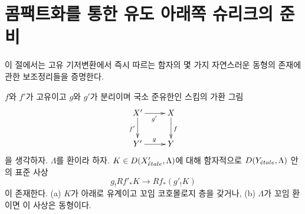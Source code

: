\section{콤팩트화를 통한 유도 아래쪽 슈리크의 준비}
\label{section-prelim}

\noindent
이 절에서는 고유 기저변환에서 즉시 따르는 함자의 몇 가지 자연스러운
동형의 존재에 관한 보조정리들을 증명한다.

\begin{lemma}
\label{lemma-shriek-proper-and-open}
$f$와 $f'$가 고유이고 $g$와 $g'$가 분리이며 국소 준유한인 스킴의
가환 그림
$$
\xymatrix{
X' \ar[r]_{g'} \ar[d]_{f'} & X \ar[d]^f \\
Y' \ar[r]^g & Y
}
$$
을 생각하자. $\Lambda$를 환이라 하자. $K \in D(X'_{\acute{e}tale}, \Lambda)$에
대해 함자적으로 $D(Y_{\acute{e}tale}, \Lambda)$ 안의 표준 사상
$$
g_!Rf'_*K \longrightarrow Rf_*(g'_!K)
$$
이 존재한다. (a) $K$가 아래로 유계이고 꼬임 코호몰로지 층을 갖거나,
(b) $\Lambda$가 꼬임 환이면 이 사상은 동형이다.
\end{lemma}


